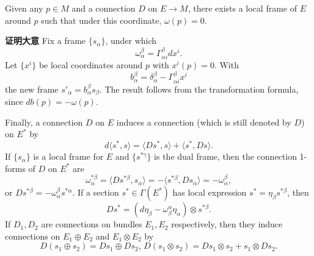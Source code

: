 \begin{theorem}{}
Given any $p\in M$ and a connection $D$ on $E\to M$, there exists a local frame of $E$ around $p$ such that under this coordinate, $\omega(p)=0$.
\end{theorem}
\textbf{证明大意} Fix a frame $\{s_\alpha\}$, under which
$$\omega^\beta_\alpha=\Gamma_{\alpha i}^\beta dx^i.$$
Let $\{x^i\}$ be local coordinates around $p$ with $x^i(p)=0$. With
$$b_\alpha^\beta=\delta_\alpha^\beta-\Gamma_{\alpha i}^\beta x^i$$
the new frame $s'_\alpha=b_\alpha^\beta s_\beta$. The result follows from the transformation formula, since $db(p)=-\omega(p)$.

Finally, a connection $D$ on $E$ induces a connection (which is still denoted by $D$) on $E^*$ by
$$d\langle s^*,s\rangle=\langle Ds^*,s\rangle+\langle s^*,Ds\rangle.$$
If $\{s_\alpha\}$ is a local frame for $E$ and $\{s^{*\gamma}\}$ is the dual frame, then the connection 1-forms of $D$ on $E^*$ are
$$\omega^{*\beta}_\alpha=\langle Ds^{*\beta},s_\alpha\rangle=-\langle s^{*\beta},Ds_\alpha\rangle=-\omega^\beta_\alpha,$$
or $Ds^{*\beta}=-\omega^\beta_\alpha s^{*\alpha}$. If a section $s^*\in\Gamma(E^*)$ has local expression $s^*=\eta_\beta s^{*\beta}$, then
$$Ds^*=(d\eta_\beta-\omega_\beta^\alpha\eta_\alpha)\otimes s^{*\beta}.$$
If $D_1,D_2$ are connections on bundles $E_1,E_2$ respectively, then they induce connections on $E_1\oplus E_2$ and $E_1\otimes E_2$ by
$$D(s_1\oplus s_2)=Ds_1\oplus Ds_2,\,D(s_1\otimes s_2)=Ds_1\otimes s_2+s_1\otimes Ds_2.$$